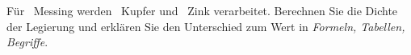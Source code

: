 Für \mMsO\ Messing werden \mCuO\ Kupfer und \mZnO\ Zink verarbeitet. Berechnen Sie die Dichte der Legierung und erklären Sie den Unterschied zum Wert in \emph{Formeln, Tabellen, Begriffe}.
